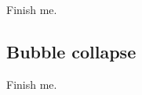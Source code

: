   Finish me.

\subsection{Bubble collapse}\label{sec:bubbleCollapse}

  Finish me.

\clearpage



\clearpage



\clearpage


\clearpage


\clearpage


